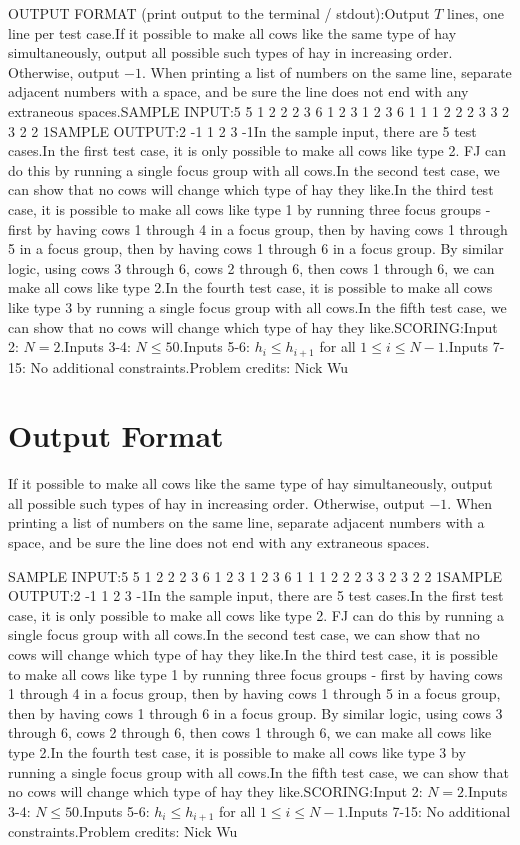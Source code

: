 \documentclass[12pt]{article}
\begin{document}
OUTPUT FORMAT (print output to the terminal / stdout):Output $T$ lines, one line per test case.If it possible to make all cows like the same type of hay simultaneously, output
all possible such types of hay in increasing order. Otherwise, output $-1$. 
When printing a list of numbers on the same line, separate adjacent numbers with
a space, and be sure the line does not end with any extraneous spaces.SAMPLE INPUT:5
5
1 2 2 2 3
6
1 2 3 1 2 3
6
1 1 1 2 2 2
3
3 2 3
2
2 1SAMPLE OUTPUT:2
-1
1 2
3
-1In the sample input, there are 5 test cases.In the first test case, it is only possible to make all cows like type 2. FJ can
do this by running a single focus group with all cows.In the second test case, we can show that no cows will change which type of hay
they like.In the third test case, it is possible to make all cows like type 1 by running
three focus groups - first by having cows 1 through 4 in a focus group, then by
having cows 1 through 5 in a focus group, then by having cows 1 through 6 in a
focus group. By similar logic, using cows 3 through 6, cows 2 through 6, then
cows 1 through 6, we can make all cows like type 2.In the fourth test case, it is possible to make all cows like type 3 by running
a single focus group with all cows.In the fifth test case, we can show that no cows will change which type of hay
they like.SCORING:Input 2: $N = 2$.Inputs 3-4: $N \le 50$.Inputs 5-6: $h_i \le h_{i+1}$ for all $1 \le i \le N-1$.Inputs 7-15: No additional constraints.Problem credits: Nick Wu

\section*{Output Format}
If it possible to make all cows like the same type of hay simultaneously, output
all possible such types of hay in increasing order. Otherwise, output $-1$. 
When printing a list of numbers on the same line, separate adjacent numbers with
a space, and be sure the line does not end with any extraneous spaces.

SAMPLE INPUT:5
5
1 2 2 2 3
6
1 2 3 1 2 3
6
1 1 1 2 2 2
3
3 2 3
2
2 1SAMPLE OUTPUT:2
-1
1 2
3
-1In the sample input, there are 5 test cases.In the first test case, it is only possible to make all cows like type 2. FJ can
do this by running a single focus group with all cows.In the second test case, we can show that no cows will change which type of hay
they like.In the third test case, it is possible to make all cows like type 1 by running
three focus groups - first by having cows 1 through 4 in a focus group, then by
having cows 1 through 5 in a focus group, then by having cows 1 through 6 in a
focus group. By similar logic, using cows 3 through 6, cows 2 through 6, then
cows 1 through 6, we can make all cows like type 2.In the fourth test case, it is possible to make all cows like type 3 by running
a single focus group with all cows.In the fifth test case, we can show that no cows will change which type of hay
they like.SCORING:Input 2: $N = 2$.Inputs 3-4: $N \le 50$.Inputs 5-6: $h_i \le h_{i+1}$ for all $1 \le i \le N-1$.Inputs 7-15: No additional constraints.Problem credits: Nick Wu
\end{document}
